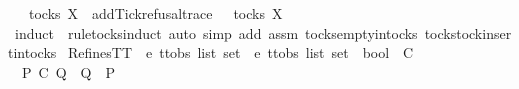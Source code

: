 \begin{isabellebody}
\ {\isachardoublequoteopen}{\isasymrho}\ {\isasymin}\ tocks\ X\ {\isasymLongrightarrow}\ add{\isacharunderscore}Tick{\isacharunderscore}refusal{\isacharunderscore}trace\ {\isasymrho}\ {\isasymin}\ tocks\ X{\isachardoublequoteclose}\isanewline
\ \ \ \ \isamarkupfalse%
\ {\isacharparenleft}induct\ {\isasymrho}\ rule{\isacharcolon}tocks{\isachardot}induct{\isacharcomma}\ auto\ simp\ add{\isacharcolon}\ assm\ tocks{\isachardot}empty{\isacharunderscore}in{\isacharunderscore}tocks\ tocks{\isachardot}tock{\isacharunderscore}insert{\isacharunderscore}in{\isacharunderscore}tocks{\isacharparenright}\isanewline
{}\isamarkupfalse%
%
\endisatagproof
{\isafoldproof}%
%
\isadelimproof
%
\endisadelimproof
%
\isadelimdocument
%
\endisadelimdocument
%
\isatagdocument
%
\isamarkuptrue%
%
\endisatagdocument
{\isafolddocument}%
%
\isadelimdocument
%
\endisadelimdocument
{}\isamarkupfalse%
\ RefinesTT\ {\isacharcolon}{\isacharcolon}\ {\isachardoublequoteopen}{\isacharprime}e\ ttobs\ list\ set\ {\isasymRightarrow}\ {\isacharprime}e\ ttobs\ list\ set\ {\isasymRightarrow}\ bool{\isachardoublequoteclose}\ {\isacharparenleft}\ {\isachardoublequoteopen}{\isasymsqsubseteq}\isactrlsub C{\isachardoublequoteclose}\ {}{}{\isacharparenright}\ \isanewline
\ \ {\isachardoublequoteopen}P\ {\isasymsqsubseteq}\isactrlsub C\ Q\ {\isacharequal}\ {\isacharparenleft}Q\ {\isasymsubseteq}\ P{\isacharparenright}{\isachardoublequoteclose}\isanewline
%
\isadelimtheory
\isanewline
%
\endisadelimtheory
%
\isatagtheory
{}\isamarkupfalse%
%
\endisatagtheory
{\isafoldtheory}%
%
\isadelimtheory
%
\endisadelimtheory
%
\end{isabellebody}%
\endinput
